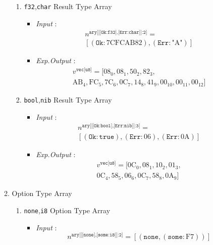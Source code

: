 \documentclass[../alan-handbook.tex]{subfiles}
\begin{document}
\begin{enumerate}
\begin{enumerate}
\begin{enumerate}
                \item \texttt{f32},\texttt{char} Result Type Array
                    \begin{itemize}
                        \item \textit{Input} : $$\begin{matrix}n^{\texttt{ary[[[Ok:f32],[Err:char]]:2]}} = \\ [(\texttt{Ok}:\text{7CFCAB82}),(\texttt{Err}:\text{"A"})]\end{matrix}$$
                        \item \textit{Exp.Output} : $$\begin{matrix}v^{\texttt{vec[u8]}} = [\text{08}_0,\text{08}_1,\text{50}_2,\text{82}_3, \\ \text{AB}_4,\text{FC}_5,\text{7C}_6,\text{0C}_7,\text{14}_8,\text{41}_9,\text{00}_{10},\text{00}_{11},\text{00}_{12}]\end{matrix}$$
                    \end{itemize}
                \item \texttt{bool},\texttt{nib} Result Type Array
                    \begin{itemize}
                        \item \textit{Input} : $$\begin{matrix}n^{\texttt{ary[[[Ok:bool],[Err:nib]]:3]}} = \\ [(\texttt{Ok}:\texttt{true}),(\texttt{Err}:\text{06}),(\texttt{Err}:\text{0A})]\end{matrix}$$
                        \item \textit{Exp.Output} : $$\begin{matrix}v^{\texttt{vec[u8]}} = [\text{0C}_0,\text{08}_1,\text{10}_2,\text{01}_3, \\ \text{0C}_4,\text{58}_5,\text{06}_6,\text{0C}_7,\text{58}_8,\text{0A}_9]\end{matrix}$$
                    \end{itemize}
            \end{enumerate}
            \item Option Type Array
            \begin{enumerate}
                \item \texttt{none},\texttt{i8} Option Type Array
                    \begin{itemize}
                        \item \textit{Input} : $$n^{\texttt{ary[[[none],[some:i8]]:2]}} = [(\texttt{none},(\texttt{some}:\text{F7}))]$$

\end{itemize}
\end{enumerate}
\end{enumerate}
\end{enumerate}
\end{document}

